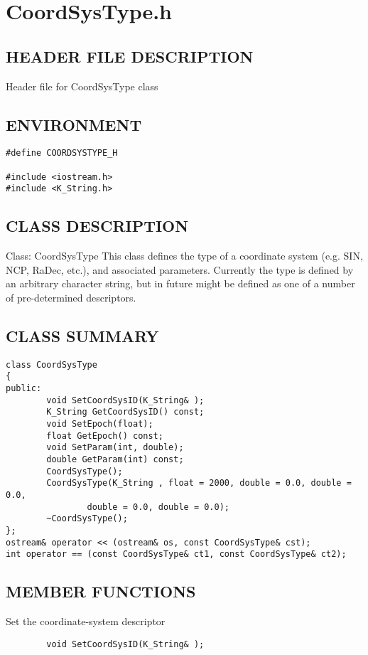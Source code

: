 \clearpage
\section{CoordSysType.h}

\subsection*{HEADER FILE DESCRIPTION}
   Header file for CoordSysType class
  
\subsection*{ENVIRONMENT}
\begin{verbatim}
#define COORDSYSTYPE_H

#include <iostream.h>
#include <K_String.h>
\end{verbatim}
 
\subsection*{CLASS DESCRIPTION}
    Class: CoordSysType
          This class defines the type of a coordinate system (e.g. SIN,
   NCP, RaDec, etc.), and associated parameters.  Currently the type is 
   defined by an arbitrary character string, but in future might be 
   defined as one of a number of pre-determined descriptors.
  
\subsection*{CLASS SUMMARY}
\begin{verbatim}
class CoordSysType
{
public:
        void SetCoordSysID(K_String& );
        K_String GetCoordSysID() const;
        void SetEpoch(float);
        float GetEpoch() const;
        void SetParam(int, double);
        double GetParam(int) const;
        CoordSysType();
        CoordSysType(K_String , float = 2000, double = 0.0, double = 0.0,
                double = 0.0, double = 0.0);
        ~CoordSysType();
};
ostream& operator << (ostream& os, const CoordSysType& cst);
int operator == (const CoordSysType& ct1, const CoordSysType& ct2);
\end{verbatim}

\subsection*{MEMBER FUNCTIONS}
           Set the coordinate-system descriptor
\begin{verbatim}
        void SetCoordSysID(K_String& );
\end{verbatim}

